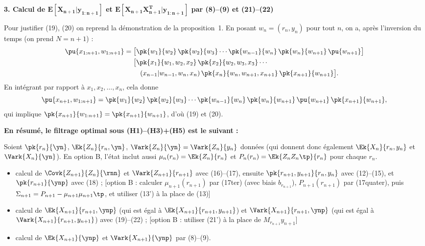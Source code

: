 \documentclass[12pt, a4paper]{article}
\begin{document}
\bigskip
\noindent\textbf{3. Calcul de $\bm{E[X_{n+1}|y_{1:n+1}]}$ et
  $\bm{E[X_{n+1}X_{n+1}^T|y_{1:n+1}]}$ par (8)--(9) et (21)--(22)}

\medskip
{\color{blue}
Pour justifier (19), (20) on reprend la démonstration de la proposition~1.
En posant $w_n = (r_n, y_n)$ pour tout $n$, on a, après l'inversion du temps
(on prend $N = n + 1$) :
\begin{align*}
  \pu{x_{1:n+1}, w_{1:n+1}} = {}
  &\bigl[\pk{w_1}{w_2}\,\pk{w_2}{w_3}\cdots\pk{w_{n-1}}{w_n}\,\pk{w_n}{w_{n+1}}\,\pu{w_{n+1}}\bigr] \\
  &\bigl[\pk{x_1}{w_1, w_2, x_2}\,\pk{x_2}{w_2, w_3, x_3}\cdots \\
  &\quad (x_{n-1}|w_{n-1}, w_n, x_n)\,\pk{x_n}{w_n, w_{n+1}, x_{n+1}}\,\pk{x_{n+1}}{w_{n+1}}\bigr].
\end{align*}
En intégrant par rapport à $x_1, x_2, \ldots, x_n$, cela donne
\[
  \pu{x_{n+1}, w_{1:n+1}}
  = \pk{w_1}{w_2}\,\pk{w_2}{w_3}\cdots\pk{w_{n-1}}{w_n}\,\pk{w_n}{w_{n+1}}\,\pu{w_{n+1}}\,
    \pk{x_{n+1}}{w_{n+1}},
\]
qui implique $\pk{x_{n+1}}{w_{1:n+1}} = \pk{x_{n+1}}{w_{n+1}}$, d'où (19) et (20).
}%

\bigskip
\noindent\textbf{En résumé, le filtrage optimal sous (H1)--(H3)+(H5) est le suivant :}

\medskip
Soient $\pk{r_n}{\yn}$, $\Ek{Z_n}{r_n, \yn}$,
$\Vark{Z_n}{\yn} = \Vark{Z_n}{y_n}$ données
(qui donnent donc également $\Ek{X_n}{r_n, y_n}$ et $\Vark{X_n}{\yn}$).
{\color{green!60!black}En option B, l'état inclut aussi $\mu_n(r_n) = \Ek{Z_n}{r_n}$ et
$P_n(r_n) = \Ek{Z_n Z_n\tp}{r_n}$ pour chaque $r_n$.}

\begin{itemize}
  \item[(i)] calcul de $\Covk{Z_{n+1}}{Z_n}{\rnn}$ et $\Vark{Z_{n+1}}{r_{n+1}}$
    avec (16)--(17), ensuite $\pk{r_{n+1}, y_{n+1}}{r_n, y_n}$ avec (12)--(15), et
    $\pk{r_{n+1}}{\ynp}$ avec (18) ;
    {\color{green!60!black}[option B : calculer $\mu_{n+1}(r_{n+1})$ par (17ter) {\color{magenta}(avec biais $b_{r_{n+1}}$)}, $P_{n+1}(r_{n+1})$ par (17quater), puis $\Sigma_{n+1}=P_{n+1}-\mu_{n+1}\mu_{n+1}\tp$, et utiliser (13') à la place de (13)]}
  \item[(ii)] calcul de $\Ek{X_{n+1}}{r_{n+1}, \ynp}$
    (qui est égal à $\Ek{X_{n+1}}{r_{n+1}, y_{n+1}}$) et
    $\Vark{X_{n+1}}{r_{n+1}, \ynp}$
    (qui est égal à $\Vark{X_{n+1}}{r_{n+1}, y_{n+1}}$) avec (19)--(22) ;
    {\color{green!60!black}[option B : utiliser (21') à la place de $M_{r_{n+1}} y_{n+1}$]}
  \item[(iii)] calcul de $\Ek{X_{n+1}}{\ynp}$ et $\Vark{X_{n+1}}{\ynp}$ par (8)--(9).
\end{itemize}
\end{document}
